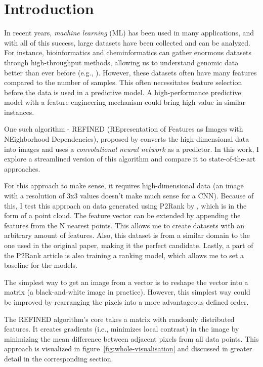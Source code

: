 \chapter*{Introduction}

In recent years, \textit{machine learning} (ML) has been used in many applications, and with all of this success, large datasets have been collected and can be analyzed. For instance, bioinformatics and cheminformatics can gather enormous datasets through high-throughput methods, allowing us to understand genomic data better than ever before (e.g., \cite{NCI-DREAM}). However, these datasets often have many features compared to the number of samples. This often necessitates feature selection before the data is used in a predictive model. A high-performance predictive model with a feature engineering mechanism could bring high value in similar instances.

One such algorithm - REFINED (REpresentation of Features as Images with NEighborhood Dependencies), proposed by \cite{REFINED} converts the high-dimensional data into images and uses a \textit{convolutional neural network} as a predictor. In this work, I explore a streamlined version of this algorithm and compare it to state-of-the-art approaches.

For this approach to make sense, it requires high-dimensional data (an image with a resolution of 3x3 values doesn't make much sense for a CNN). Because of this, I test this approach on data generated using P2Rank by \cite{P2RANK}, which is in the form of a point cloud. The feature vector can be extended by appending the features from the N nearest points. This allows me to create datasets with an arbitrary amount of features. Also, this dataset is from a similar domain to the one used in the original paper, making it the perfect candidate. Lastly, a part of the P2Rank article is also training a ranking model, which allows me to set a baseline for the models.

The simplest way to get an image from a vector is to reshape the vector into a matrix (a black-and-white image in practice). However, this simplest way could be improved by rearranging the pixels into a more advantageous defined order.

The REFINED algorithm's core takes a matrix with randomly distributed features. It creates gradients (i.e., minimizes local contrast) in the image by minimizing the mean difference between adjacent pixels from all data points. This approach is visualized in figure~\ref{fig:whole-visualisation} and discussed in greater detail in the corresponding section.

